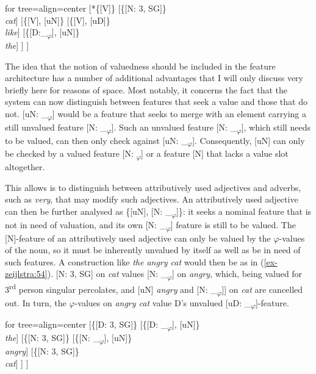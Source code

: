 \documentclass[output=paper
,modfonts
,nonflat]{langsci/langscibook}
\begin{document}
\ea \label{ex-zeijlstra:53}
			\begin{forest}	for tree={align=center}
				[*\{{[}V{]}\}
				[\{{[}N: 3{,} SG{]}\}\\ \textit{cat}]
				[\{{[}V{]}{,} {[}uN{]}\}
				[\{{[}V{]}{,} {[}uD{]}\}\\ \textit{like}]
				[\{{[}D:\_\textsubscript{$\varphi$}{]}{,} {[}uN{]}\}\\ \textit{the}]
				] ] 
		\end{forest}\z

\noindent The idea that the notion of valuedness should be included in the feature architecture has a number of additional advantages that I will only discuss very briefly here for reasons of space. Most notably, it concerns the fact that the system can now distinguish between features that seek a value and those that do not. [uN: \_\textsubscript{$\varphi$}] would be a feature that seeks to merge with an element carrying a still unvalued feature [N: \_\textsubscript{$\varphi$}]. Such an unvalued feature [N: \_\textsubscript{$\varphi$}], which still needs to be valued, can then only check against [uN: \_\textsubscript{$\varphi$}]. Consequently, [uN] can only be checked by a valued feature [N: \textsubscript{$\varphi$}] or a feature [N] that lacks a value slot altogether. 

This allows is to distinguish between attributively used adjectives and adverbs, such as \textit{very}, that may modify such adjectives. An attributively used adjective can then be further analysed as \{[uN], [N: \_\textsubscript{$\varphi$}]\}: it seeks a nominal feature that is not in need of valuation, and its own [N: \_\textsubscript{$\varphi$}] feature is still to be valued. The [N]-feature of an attributively used adjective can only be valued by the $\varphi$-values of the noun, so it must be inherently unvalued by itself as well as be in need of such features. A construction like \textit{the angry cat} would then be as in (\ref{ex-zeijlstra:54}). [N: 3, SG] on \textit{cat} values [N: \_\textsubscript{$\varphi$}] on \textit{angry}, which, being valued for 3\textsuperscript{rd} person singular percolates, and [uN] \textit{angry} and [N: \_\textsubscript{$\varphi$}]] on \textit{cat} are cancelled out. In turn, the $\varphi$-values on \textit{angry cat} value D’s unvalued [uD: \_\textsubscript{$\varphi$}]-feature.


\begin{exe}
\ex\label{ex-zeijlstra:54}
	\begin{forest}	for tree={align=center}
	[\{{[}D: 3{,} SG{]}\}
	[\{{[}D: \_\textsubscript{$\varphi$}{]}{,} {[}uN{]}\}\\ \textit{the}]
	[\{{[}N: 3{,} SG{]}\}
	[\{{[}N: \_\textsubscript{$\varphi$}{]}{,} {[}uN{]}\}\\ \textit{angry}]
	[\{{[}N: 3{,} SG{]}\}\\ \textit{cat}]
	] ]  
	\end{forest}
\end{exe} 
\end{document}
